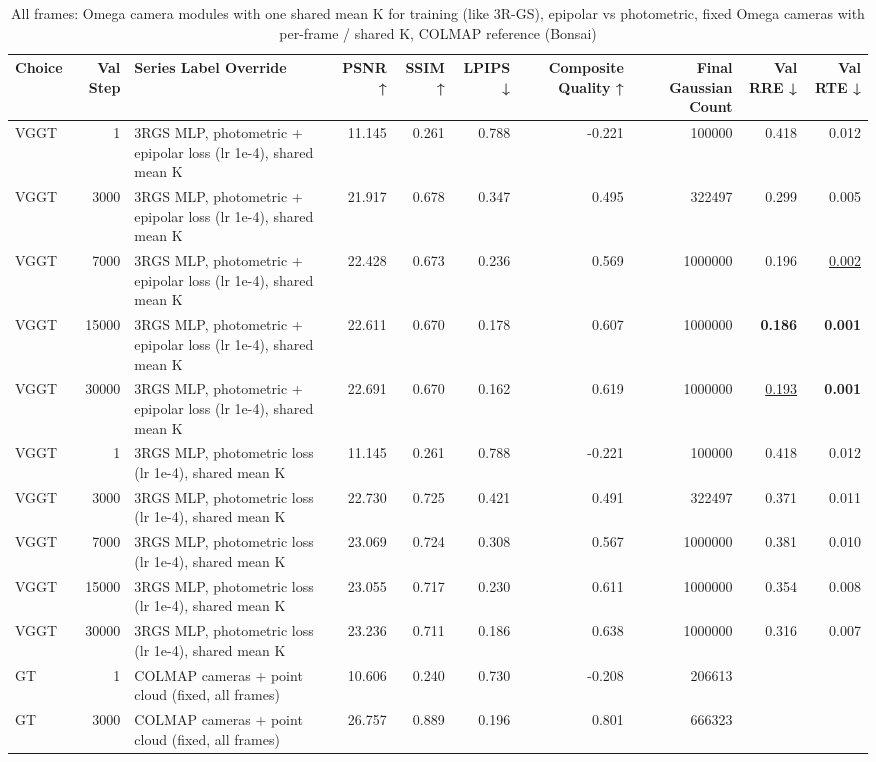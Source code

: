 \begin{table}[H]
\caption{\ifdefined\customcaption \customcaption \else All frames: Omega camera modules with one shared mean K for training (like 3R-GS), epipolar vs photometric, fixed Omega cameras with per-frame / shared K, COLMAP reference (Bonsai) \fi}
\label{tab:120_omega_epi_meank_bonsai}
\centering
\tiny
\begin{tabular}{lrlrrrrrrr}
\toprule
Choice & Val Step & Series Label Override & PSNR ↑ & SSIM ↑ & LPIPS ↓ & Composite Quality ↑ & Final Gaussian Count & Val RRE ↓ & Val RTE ↓ \\
\midrule
VGGT & 1 & 3RGS MLP, photometric + epipolar loss (lr 1e-4), shared mean K & 11.145 & 0.261 & 0.788 & -0.221 & 100000 & 0.418 & 0.012 \\
VGGT & 3000 & 3RGS MLP, photometric + epipolar loss (lr 1e-4), shared mean K & 21.917 & 0.678 & 0.347 & 0.495 & 322497 & 0.299 & 0.005 \\
VGGT & 7000 & 3RGS MLP, photometric + epipolar loss (lr 1e-4), shared mean K & 22.428 & 0.673 & 0.236 & 0.569 & 1000000 & 0.196 & \underline{0.002} \\
VGGT & 15000 & 3RGS MLP, photometric + epipolar loss (lr 1e-4), shared mean K & 22.611 & 0.670 & 0.178 & 0.607 & 1000000 & \textbf{0.186} & \textbf{0.001} \\
VGGT & 30000 & 3RGS MLP, photometric + epipolar loss (lr 1e-4), shared mean K & 22.691 & 0.670 & 0.162 & 0.619 & 1000000 & \underline{0.193} & \textbf{0.001} \\
VGGT & 1 & 3RGS MLP, photometric loss (lr 1e-4), shared mean K & 11.145 & 0.261 & 0.788 & -0.221 & 100000 & 0.418 & 0.012 \\
VGGT & 3000 & 3RGS MLP, photometric loss (lr 1e-4), shared mean K & 22.730 & 0.725 & 0.421 & 0.491 & 322497 & 0.371 & 0.011 \\
VGGT & 7000 & 3RGS MLP, photometric loss (lr 1e-4), shared mean K & 23.069 & 0.724 & 0.308 & 0.567 & 1000000 & 0.381 & 0.010 \\
VGGT & 15000 & 3RGS MLP, photometric loss (lr 1e-4), shared mean K & 23.055 & 0.717 & 0.230 & 0.611 & 1000000 & 0.354 & 0.008 \\
VGGT & 30000 & 3RGS MLP, photometric loss (lr 1e-4), shared mean K & 23.236 & 0.711 & 0.186 & 0.638 & 1000000 & 0.316 & 0.007 \\
GT & 1 & COLMAP cameras + point cloud (fixed, all frames) & 10.606 & 0.240 & 0.730 & -0.208 & 206613 &  &  \\
GT & 3000 & COLMAP cameras + point cloud (fixed, all frames) & 26.757 & 0.889 & 0.196 & 0.801 & 666323 &  &  \\

\end{tabular}
\end{table}
